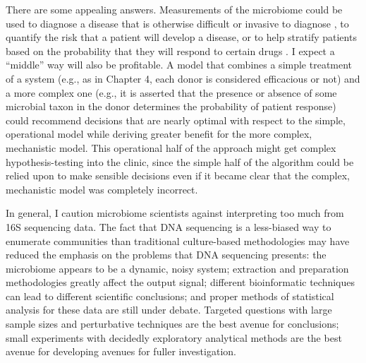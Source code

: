 There are some appealing answers. Measurements of the microbiome
could be used to diagnose a disease that is otherwise difficult or
invasive to diagnose \cite{papa-noninvasive-2012}, to quantify the
risk that a patient will develop a disease, or to help stratify
patients based on the probability that they will respond to certain
drugs \cite{koeth-intestinal-2013,sivan-commensal-2015,vetizou-anticancer-2015}.
I expect a ``middle'' way will also be profitable. A model that
combines a simple treatment of a system (e.g., as in Chapter 4,
each donor is considered efficacious or not) and a more complex one
(e.g., it is asserted that the presence or absence of some microbial
taxon in the donor determines the probability of patient response)
could recommend decisions that are nearly optimal with respect to
the simple, operational model while deriving greater benefit for
the more complex, mechanistic model. This operational half of
the approach might get complex hypothesis-testing into the clinic,
since the simple half of the algorithm could be relied upon to
make sensible decisions even if it became clear that the complex,
mechanistic model was completely incorrect.

In general, I caution microbiome scientists against interpreting too
much from 16S sequencing data. The fact that DNA sequencing is a
less-biased way to enumerate communities than traditional
culture-based methodologies may have reduced the emphasis on the
problems that DNA sequencing presents: the microbiome appears to
be a dynamic, noisy system; extraction and preparation methodologies
greatly affect the output signal; different bioinformatic techniques
can lead to different scientific conclusions; and proper methods
of statistical analysis for these data are still under debate.
Targeted questions with large sample sizes and perturbative
techniques are the best avenue for conclusions; small experiments
with decidedly exploratory analytical methods are the best
avenue for developing avenues for fuller investigation.

\begin{singlespace}


\end{singlespace}
